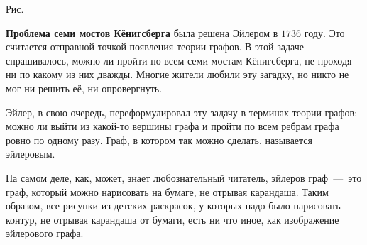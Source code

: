 \begin{example}
\begin{paracol}{2}
\begin{center}

	\small Рис. \images
\end{center}\end{paracol}\end{example}


	\textbf{Проблема семи мостов Кёнигсберга} была решена Эйлером в $1736$ году. Это считается отправной точкой появления теории графов. 
	В этой задаче спрашивалось, можно ли пройти по всем семи мостам Кёнигсберга, не проходя ни по какому из них дважды. 
	Многие жители любили эту загадку, но никто не мог ни решить её, ни опровергнуть. 
	
	Эйлер, в свою очередь, переформулировал эту задачу в терминах теории графов: можно ли выйти из какой-то вершины графа и 
	пройти по всем ребрам графа ровно по одному разу. Граф, в котором так можно сделать, называется эйлеровым. 

	На самом деле, как, может, знает любознательный читатель, эйлеров граф~---~это граф, который можно нарисовать на бумаге, не отрывая карандаша. 
	Таким образом, все рисунки из детских раскрасок, у которых надо было нарисовать контур, не отрывая карандаша от бумаги, есть ни что иное, 
	как изображение эйлерового графа. 

